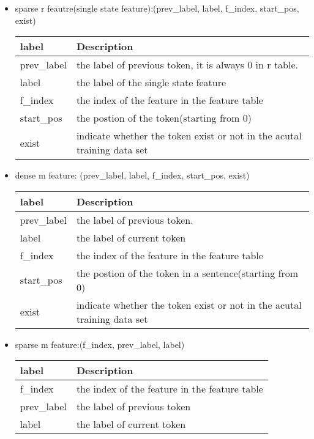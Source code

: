 \begin{itemize}

\item 
sparse r feautre(single state feature):(prev\_label, label, f\_index, start\_pos, exist)

\begin{center}
    \begin{tabular}{ | l | l |}
    \hline
    label & Description \\ \hline
    prev\_label & the label of previous token, it is always 0 in r table.\\ 
    label       & the label of the single state feature\\
    f\_index    & the index of the feature in the feature table\\
    start\_pos  & the postion of the token(starting from 0)\\
    exist       & indicate whether the token exist or not in the acutal training data set\\
    \hline
    \end{tabular}
\end{center}

\item 
dense m feature:
(prev\_label, label, f\_index, start\_pos, exist)
\begin{center}
    \begin{tabular}{ | l | l |}
    \hline
    label & Description \\ \hline
    prev\_label & the label of previous token.\\ 
    label       & the label of current token\\
    f\_index    & the index of the feature in the feature table\\
    start\_pos  & the postion of the token in a sentence(starting from 0)\\
    exist       & indicate whether the token exist or not in the acutal training data set\\
    \hline
    \end{tabular}
\end{center}

\item 
sparse m feature:(f\_index, prev\_label, label)
\begin{center}
    \begin{tabular}{ | l | l |}
    \hline
    label & Description \\ \hline
    f\_index    &  the index of the feature in the feature table\\
    prev\_label &  the label of previous token \\
    label       &  the label of current token\\
    \hline
    \end{tabular}
\end{center}

\end{itemize}
